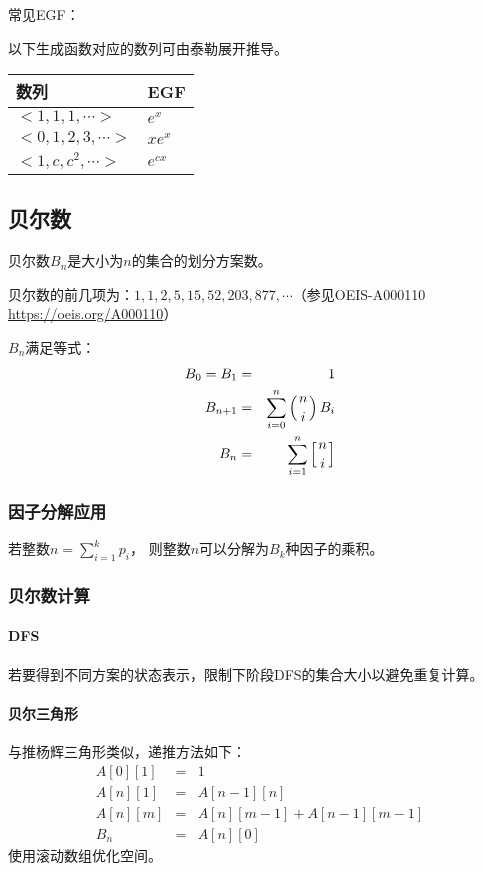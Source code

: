 常见EGF：

以下生成函数对应的数列可由泰勒展开推导。

\begin{tabular}{|l|l|}
	\hline
	数列               & EGF      \\
	\hline
	$<1,1,1,\cdots>$   & $e^x$    \\
	\hline
	$<0,1,2,3,\cdots>$ & $xe^x$   \\
	\hline
	$<1,c,c^2,\cdots>$ & $e^{cx}$ \\
	\hline
\end{tabular}

\subsection{贝尔数}
贝尔数$B_n$是大小为$n$的集合的划分方案数。

贝尔数的前几项为：$1, 1, 2, 5, 15, 52, 203, 877,\cdots$（参见OEIS-A000110\\
\url{https://oeis.org/A000110}）

$B_n$满足等式：
\begin{eqnarray*}
	B_0=B_1&=&1\\
	B_{n+1}&=&\sum_{i=0}^n{\left(n \atop i\right)B_i}\\
	B_n&=&\sum_{i=1}^n{\left[n \atop i\right]}
\end{eqnarray*}

\subsubsection{因子分解应用}
若整数$\displaystyle n=\sum_{i=1}^k{p_i}$，
则整数$n$可以分解为$B_k$种因子的乘积。
\subsubsection{贝尔数计算}
\paragraph{DFS}若要得到不同方案的状态表示，限制下阶段DFS的集合大小以避免重复计算。
\paragraph{贝尔三角形}
与推杨辉三角形类似，递推方法如下：
\begin{eqnarray*}
	A[0][1]&=&1\\
	A[n][1]&=&A[n-1][n]\\
	A[n][m]&=&A[n][m-1]+A[n-1][m-1]\\
	B_n&=&A[n][0]
\end{eqnarray*}
使用滚动数组优化空间。
